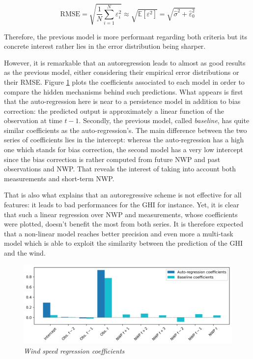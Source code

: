 \documentclass{article}
\newcommand{\saut}{\vspace{10px}}
\begin{document}
\[
	\mathrm{RMSE} = \sqrt{\frac{1}{N} \sum_{i = 1}^N \varepsilon^2_i} \approx \sqrt{ \mathbb E [\varepsilon^2] }
	= \sqrt{\hat \sigma^2 + \hat \varepsilon^2_0}
\]

Therefore, the previous model is more performant regarding both criteria but its concrete interest
rather lies in the error distribution being sharper.

\saut

However, it is remarkable that an autoregression leads to almost as good results as the previous model, either
considering their empirical error distributions or their RMSE. Figure \ref{fig:Fig. 6} plots the coefficients associated to
each model in order to compare the hidden mechanisms behind such predictions. What appears is first that
the auto-regression here is near to a persistence model in addition to bias correction: the predicted output is
approximately a linear function of the observation at time $t - 1$. Secondly, the previous model, called \emph{baseline},
has quite similar coefficients as the auto-regression's. The main difference between the two series of coefficients
lies in the intercept: whereas the auto-regression has a high one which stands for bias correction, the second model
has a very low intercept since the bias correction is rather computed from future NWP and past observations and NWP.
That reveals the interest of taking into account both measurements and short-term NWP.

\saut

That is also what explains that an autoregressive scheme
is not effective for all features: it leads to bad performances for the GHI
for instance. Yet, it is clear that such a linear regression over NWP and measurements, whose coefficients were
plotted, doesn't benefit the most from both series. It is therefore expected that a non-linear model reaches
better precision and even more a multi-task model which is able to exploit the similarity between the prediction of
the GHI and the wind.


\begin{figure}[H]
    \centering
    \includegraphics[width=\linewidth]{img/coef.png}
    \caption{\textit{Wind speed regression coefficients}}
    \label{fig:Fig. 6}
\end{figure}
\end{document}
